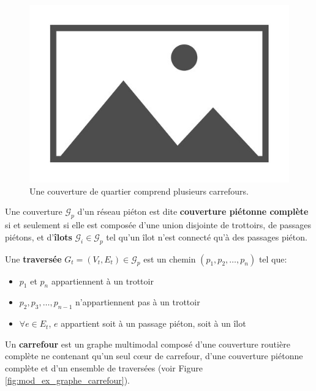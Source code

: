 \begin{figure}
    \centering
    \includegraphics{images/placeholder.jpg}
    \caption{Une couverture de quartier comprend plusieurs carrefours.}
    \label{fig:mod_ex_couverture_routiere_quartier}
\end{figure}

\begin{definition}
    Une couverture $\mathcal{G}_p$ d'un réseau piéton est dite \textbf{couverture piétonne complète} si et seulement si elle est composée d'une union disjointe de trottoirs, de passages piétons, et d'\textbf{îlots} $\mathcal{G}_i \in \mathcal{G}_p$ tel qu'un îlot n'est connecté qu'à des passages piéton.
\end{definition}

\begin{definition}
    Une \textbf{traversée} $G_{t} = (V_{t}, E_{t}) \in \mathcal{G}_p$ est un chemin $(p_1, p_2,\dots, p_n)$ tel que:

    \begin{itemize}
        \item $p_1$ et $p_n$ appartiennent à un trottoir
        \item $p_2, p_3, \dots, p_{n-1}$ n'appartiennent pas à un trottoir
        \item $\forall e \in E_t$, $e$ appartient soit à un passage piéton, soit à un îlot
    \end{itemize}
\end{definition}

\begin{definition}
    Un \textbf{carrefour} est un graphe multimodal composé d'une couverture routière complète ne contenant qu'un seul cœur de carrefour, d'une couverture piétonne complète et d'un ensemble de traversées (voir Figure \ref{fig:mod_ex_graphe_carrefour}).
\end{definition}

